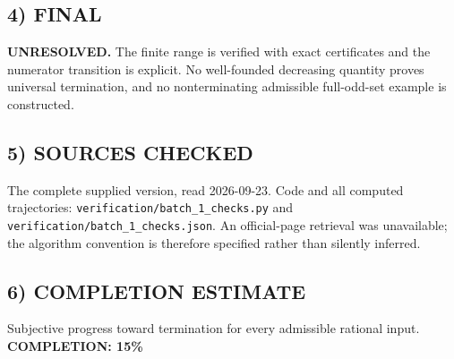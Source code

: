 \subsection*{4) FINAL}
\textbf{UNRESOLVED.} The finite range is verified with exact certificates and the numerator transition is explicit. No well-founded decreasing quantity proves universal termination, and no nonterminating admissible full-odd-set example is constructed.
\subsection*{5) SOURCES CHECKED}
The complete supplied version, read 2026-09-23. Code and all computed trajectories: \texttt{verification/batch\_1\_checks.py} and \texttt{verification/batch\_1\_checks.json}. An official-page retrieval was unavailable; the algorithm convention is therefore specified rather than silently inferred.
\subsection*{6) COMPLETION ESTIMATE}
Subjective progress toward termination for every admissible rational input.
\textbf{COMPLETION: 15\%}
